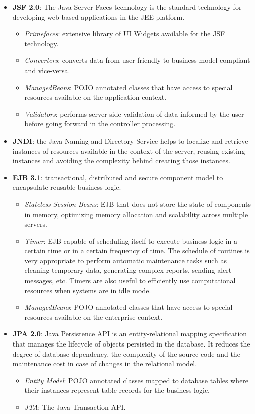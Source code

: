 \documentclass[envcountsame,envcountchap]{svmono}
\begin{document}
\begin{itemize}
\item \textbf{JSF 2.0}: The Java Server Faces technology is the standard technology for developing web-based applications in the JEE platform.
   \begin{itemize}
   \item \textit{Primefaces}: extensive library of UI Widgets 
   available for the JSF technology.
   \item \textit{Converters}: converts data from user friendly to
   business model-compliant and vice-versa.
   \item \textit{ManagedBeans}: POJO annotated classes that have
   access to special resources available on the
   application context.
   \item \textit{Validators}: performs server-side validation of
   data informed by the user before going forward in the
   controller processing.
   \end{itemize}
\item \textbf{JNDI}: the Java Naming and Directory Service helps to localize and retrieve instances of resources available in the context of the server, reusing existing instances and avoiding the complexity behind creating those instances.
\item \textbf{EJB 3.1}: transactional, distributed and secure component model to encapsulate reusable business logic.
   \begin{itemize}
   \item \textit{Stateless Session Beans}: EJB that does not store
   the state of components in memory, optimizing memory
   allocation and scalability across multiple servers.
   \item \textit{Timer}: EJB capable of scheduling itself to
   execute business logic in a certain time or in a
   certain frequency of time. The schedule of routines is
   very appropriate to perform automatic maintenance
   tasks such as cleaning temporary data, generating
   complex reports, sending alert messages, etc. Timers
   are also useful to efficiently use computational
   resources when systems are in idle mode.
   \item \textit{ManagedBeans}: POJO annotated classes that have
   access to  special resources available on the enterprise
   context.
   \end{itemize}
\item \textbf{JPA 2.0}: Java Persistence API is an entity-relational mapping specification that manages the lifecycle of objects persisted in the database. It reduces the degree of database dependency, the complexity of the source code and the maintenance cost in case of changes in the relational model.
   \begin{itemize}
   \item \textit{Entity Model}: POJO annotated classes mapped to
   database tables where their instances represent table records
   for the business logic.
   \item \textit{JTA}: The Java Transaction API.
   \end{itemize}
\end{itemize}
\end{document}

